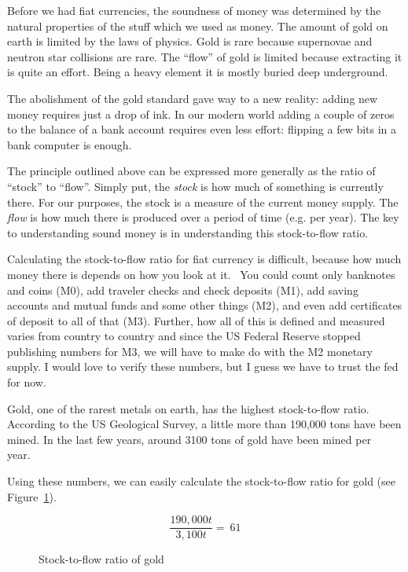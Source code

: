 Before we had fiat currencies, the soundness of money was determined by
the natural properties of the stuff which we used as money. The amount
of gold on earth is limited by the laws of physics. Gold is rare because
supernovae and neutron star collisions are rare. The \enquote{flow} of gold is
limited because extracting it is quite an effort. Being a heavy element
it is mostly buried deep underground.

The abolishment of the gold standard gave way to a new reality: adding new money
requires just a drop of ink. In our modern world adding a couple of zeros to the
balance of a bank account requires even less effort: flipping a few bits in a
bank computer is enough.


The principle outlined above can be expressed more generally as the
ratio of \enquote{stock} to \enquote{flow}. Simply put, the \textit{stock} is how much of
something is currently there. For our purposes, the stock is a measure
of the current money supply. The \textit{flow} is how much there is produced
over a period of time (e.g. per year). The key to understanding sound
money is in understanding this stock-to-flow ratio.

Calculating the stock-to-flow ratio for fiat currency is difficult, because how
much money there is depends on how you look at it.~\cite{wiki:money-supply} You
could count only banknotes and coins (M0), add traveler checks and check
deposits (M1), add saving accounts and mutual funds and some other things (M2),
and even add certificates of deposit to all of that (M3). Further, how all of
this is defined and measured varies from country to country and since the US
Federal Reserve stopped publishing \cite{web:fed-m3} numbers for M3, we will
have to make do with the M2 monetary supply. I would love to verify these
numbers, but I guess we have to trust the fed for now.

Gold, one of the rarest metals on earth, has the highest stock-to-flow
ratio. According to the US Geological Survey, a little more than 190,000
tons have been mined. In the last few years, around 3100 tons of gold
have been mined per year.~\cite{mineral-commodity-summaries}

Using these numbers, we can easily calculate the stock-to-flow ratio for
gold (see Figure~\ref{fig:stock-to-flow-gold}).

\begin{figure}
  \centering
  \begin{equation}
  \frac{190,000 t}{3,100 t} = ~ 61
  \end{equation}
  \caption{Stock-to-flow ratio of gold}
  \label{fig:stock-to-flow-gold}
\end{figure}

